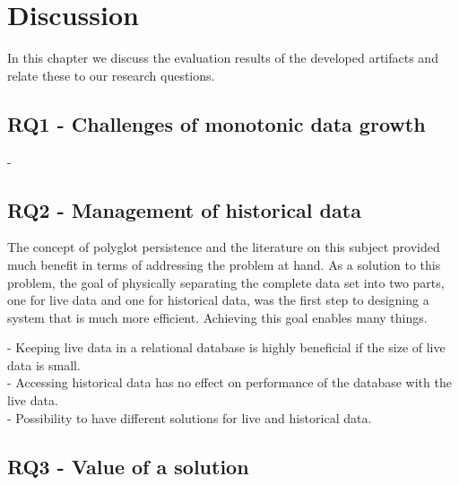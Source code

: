 \chapter{Discussion}
\label{chap:discussion}
In this chapter we discuss the evaluation results of the developed artifacts and relate these to our research questions.

\section{RQ1 - Challenges of monotonic data growth}
- 


\section{RQ2 - Management of historical data}
The concept of polyglot persistence and the literature on this subject provided much benefit in terms of addressing the problem at hand. As a solution to this problem, the goal of physically separating the complete data set into two parts, one for live data and one for historical data, was the first step to designing a system that is much more efficient. Achieving this goal enables many things. 

- Keeping live data in a relational database is highly beneficial if the size of live data is small. \\
- Accessing historical data has no effect on performance of the database with the live data. \\
- Possibility to have different solutions for live and historical data. \\



\section{RQ3 - Value of a solution}
